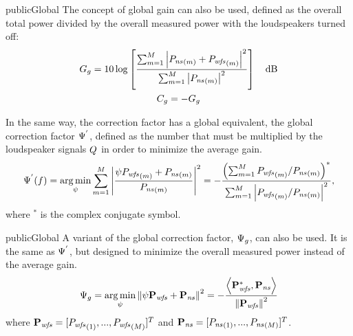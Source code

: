 \begin{shownto}{publicGlobal}
	The concept of global gain can also be used, defined as the overall total power divided by the overall measured power with the loudspeakers turned off:
	\begin{gather}
		\globalGain = 10 \log \left[\frac{\sum_{m=1}^\numMeasPoints \abs{\Field[ns][frequency][scalar][m] + \Field[wfs][frequency][scalar][m]}^2}{\sum_{m=1}^\numMeasPoints \abs{\Field[ns][frequency][scalar][m]}^2}\right] \quad \si{dB}
		\\
		\globalCancellation = -\globalGain
	\end{gather}
\end{shownto}

In the same way, the correction factor has a global equivalent, the global correction factor $\Psi^{'}$, defined as the number that must be multiplied by the loudspeaker signals $\signal[wfs][frequency]$ in order to minimize the average gain.
\begin{equation}
\globalCorrectionFactorAverGain(f) = \argmin_{\psi} \sum_{m=1}^\numMeasPoints \abs{\frac{\psi \Field[wfs][frequency][scalar][m] + \Field[ns][frequency][scalar][m]}{\Field[ns][frequency][scalar][m]}}^2 =
-\frac{\left(\sum_{m=1}^\numMeasPoints \Field[wfs][frequency][scalar][m]/\Field[ns][frequency][scalar][m]\right)^*}{\sum_{m=1}^\numMeasPoints \abs{\Field[wfs][frequency][scalar][m]/\Field[ns][frequency][scalar][m]}^2},
\end{equation}
where $^*$ is the complex conjugate symbol.

\begin{shownto}{publicGlobal}	
A variant of the global correction factor, $\Psi_g$, can also be used. It is the same as $\Psi^{'}$, but designed to minimize the overall measured power instead of the average gain.
	\begin{equation}
	\globalCorrectionFactor = \argmin_{\psi} \norm{\psi \Field[wfs][frequency][vector] + \Field[ns][frequency][vector]}^2 = -\frac{\scalarProd{\Field[wfs][frequency][vector]^*}{\Field[ns][frequency][vector]}}{\norm{\Field[wfs][frequency][vector]}^2}
	\end{equation}
	where $\Field[wfs][frequency][vector] = [\Field[wfs][frequency][scalar][1],...,\Field[wfs][frequency][scalar][\numMeasPoints]]^T$ and $\Field[ns][frequency][vector] = [\Field[ns][frequency][scalar][1],...,\Field[ns][frequency][scalar][\numMeasPoints]]^T$.
\end{shownto}

